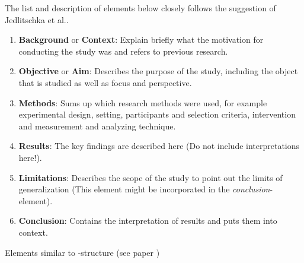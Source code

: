 The list and description of elements below closely follows the suggestion of Jedlitschka et al.\cite{Jedlitschka2008}.
\begin{enumerate}
	\item \textbf{Background} or \textbf{Context}: Explain briefly what the motivation for conducting the study was and refers to previous research.
	\item \textbf{Objective} or \textbf{Aim}: Describes the purpose of the study, including the object that is studied as well as focus and perspective. 
	\item \textbf{Methods}: Sums up which research methods were used, for example experimental design, setting, participants and selection criteria, intervention and measurement and analyzing technique.
	\item \textbf{Results}: The key findings are described here (Do not include interpretations here!).
	\item \textbf{Limitations}: Describes the scope  of the study to point out the limits of generalization (This element might be incorporated in the \emph{conclusion}-element).
	\item \textbf{Conclusion}:  Contains the interpretation of results and puts them into context.
\end{enumerate}
\newline
Elements similar to -structure (see paper )
	
